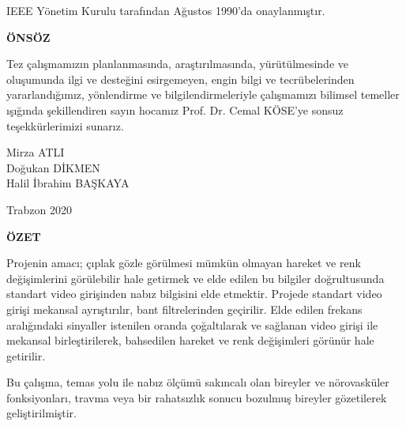 \documentclass[a4paper, 12pt]{article}
\begin{document}
\begin{flushright} IEEE Yönetim Kurulu tarafından Ağustos 1990’da onaylanmıştır.\end{flushright}

\normalsize
\newpage

{}

\hspace{5cm}
\begin{center}
\large \textbf{ÖNSÖZ}
\end{center}
\vspace{1cm}

Tez çalışmamızın planlanmasında, araştırılmasında, yürütülmesinde ve oluşumunda ilgi ve desteğini esirgemeyen, engin bilgi ve tecrübelerinden yararlandığımız, yönlendirme ve bilgilendirmeleriyle çalışmamızı bilimsel temeller ışığında şekillendiren sayın hocamız Prof. Dr. Cemal KÖSE'ye sonsuz teşekkürlerimizi sunarız.

\vspace{2cm}
\begin{flushright}
Mirza ATLI \\
Doğukan DİKMEN \\
Halil İbrahim BAŞKAYA \\ 
\vspace{0.2cm}

Trabzon 2020
\end{flushright}
 
\newpage
\tableofcontents

{}


\newpage

{}

\begin{center}
	\large \textbf{ÖZET}
\end{center}

Projenin amacı; çıplak gözle görülmesi mümkün olmayan hareket ve renk değişimlerini görülebilir hale getirmek ve elde edilen bu bilgiler doğrultusunda standart video girişinden nabız bilgisini elde etmektir. Projede standart video girişi mekansal ayrıştırılır, bant filtrelerinden geçirilir. Elde edilen frekans aralığındaki sinyaller istenilen oranda çoğaltılarak ve sağlanan video girişi ile mekansal birleştirilerek, bahsedilen hareket ve renk değişimleri görünür hale getirilir.

Bu çalışma, temas yolu ile nabız ölçümü sakıncalı olan bireyler ve nörovasküler fonksiyonları, travma veya bir rahatsızlık sonucu bozulmuş bireyler gözetilerek geliştirilmiştir.  
\end{document}
